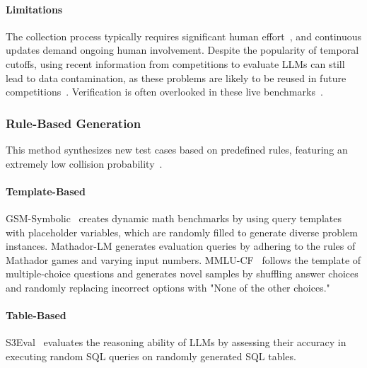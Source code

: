 \paragraph{Limitations}
The collection process typically requires significant human effort~\citep{white2024livebench,jain2024livecodebenchholisticcontaminationfree}, and continuous updates demand ongoing human involvement. Despite the popularity of temporal cutoffs, using recent information from competitions to evaluate LLMs can still lead to data contamination, as these problems are likely to be reused in future competitions~\citep{wu2024antileak}. Verification is often overlooked in these live benchmarks~\citep{white2024livebench}.

\subsubsection{Rule-Based Generation}
This method synthesizes new test cases based on predefined rules, featuring an extremely low collision probability~\citep{zhu2024dyval}.

\paragraph{Template-Based}
GSM-Symbolic~\citep{mirzadeh2025gsmsymbolic} creates dynamic math benchmarks by using query templates with placeholder variables, which are randomly filled to generate diverse problem instances.
Mathador-LM\citep{kurtic-etal-2024-mathador} generates evaluation queries by adhering to the rules of Mathador games\citep{PUMA2023105587} and varying input numbers.
MMLU-CF~\citep{zhao2024mmlu} follows the template of multiple-choice questions and generates novel samples by shuffling answer choices and randomly replacing incorrect options with "None of the other choices."


\paragraph{Table-Based}
S3Eval~\citep{lei-etal-2024-s3eval} evaluates the reasoning ability of LLMs by assessing their accuracy in executing random SQL queries on randomly generated SQL tables.

